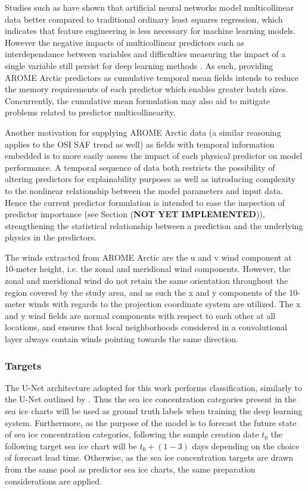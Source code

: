 \documentclass[../main/thesis]{subfiles}
\begin{document}
Studies such as \citet{Obite2020} have shown that artificial neural networks model multicollinear data better compared to traditional ordinary least squares regression, which indicates that feature engineering is less necessary for machine learning models. However the negative impacts of multicollinear predictors such as interdependance between variables and difficulties measuring the impact of a single variable still persist for deep learning methods \citep{Chan2022}. As such, providing AROME Arctic predictors as cumulative temporal mean fields intends to reduce the memory requirements of each predictor which enables greater batch sizes. Concurrently, the cumulative mean formulation may also aid to mitigate problems related to predictor multicollinearity.

Another motivation for supplying AROME Arctic data (a similar reasoning applies to the OSI SAF trend as well) as fields with temporal information embedded is to more easily assess the impact of each physical predictor on model performance. A temporal sequence of data both restricts the possibility of altering predictors for explainability purposes as well as introducing complexity to the nonlinear relationship between the model parameters and input data. Hence the current predictor formulation is intended to ease the inspection of predictor importance (see Section (\textbf{NOT YET IMPLEMENTED})), strengthening the statistical relationship between a prediction and the underlying physics in the predictors.

The winds extracted from AROME Arctic are the u and v wind component at 10-meter height, i.e. the zonal and meridional wind components. However, the zonal and meridional wind do not retain the same orientation throughout the region covered by the study area, and as such the x and y components of the 10-meter winds with regards to the projection coordinate system are utilized. The x and y wind fields are normal components with respect to each other at all locations, and ensures that local neighborhoods considered in a convolutional layer always contain winds pointing towards the same direction.

\subsubsection{Targets}
\label{sec:data_targets}
The U-Net architecture adopted for this work performs classification, similarly to the U-Net outlined by \citet{Ronneberger2015}. Thus the sea ice concentration categories present in the sea ice charts \citep{Dinessen2020} will be used as ground truth labels when training the deep learning system. Furthermore, as the purpose of the model is to forecast the future state of sea ice concentration categories, following the sample creation date $t_0$ the following target sea ice chart will be $t_0 + (1 - 3)$ days depending on the choice of forecast lead time. Otherwise, as the sea ice concentration targets are drawn from the same pool as predictor sea ice charts, the same preparation considerations are applied.
\end{document}
